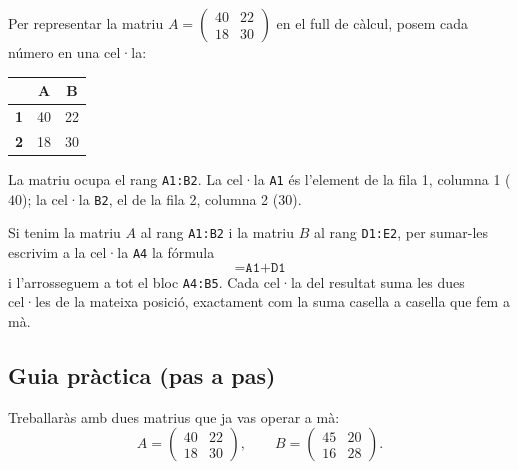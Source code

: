 \begin{exemple}
Per representar la matriu $A=\begin{pmatrix} 40 & 22 \\ 18 & 30 \end{pmatrix}$
en el full de càlcul, posem cada número en una cel·la:
\begin{center}
\begin{tabular}{c|cc}
 & \textbf{A} & \textbf{B} \\
\hline
\textbf{1} & 40 & 22 \\
\textbf{2} & 18 & 30 \\
\end{tabular}
\end{center}
La matriu ocupa el rang \texttt{A1:B2}. La cel·la \texttt{A1} és l'element de la
fila 1, columna 1 ($40$); la cel·la \texttt{B2}, el de la fila 2, columna 2 ($30$).
\end{exemple}

\begin{exemple}
Si tenim la matriu $A$ al rang \texttt{A1:B2} i la matriu $B$ al rang
\texttt{D1:E2}, per sumar-les escrivim a la cel·la \texttt{A4} la fórmula
\[
\texttt{=A1+D1}
\]
i l'arrosseguem a tot el bloc \texttt{A4:B5}. Cada cel·la del resultat suma les
dues cel·les de la mateixa posició, exactament com la suma casella a casella que
fem a mà.
\end{exemple}

\subsection{Guia pràctica (pas a pas)}

Treballaràs amb dues matrius que ja vas operar a mà:
\[
A=\begin{pmatrix} 40 & 22 \\ 18 & 30 \end{pmatrix},\qquad
B=\begin{pmatrix} 45 & 20 \\ 16 & 28 \end{pmatrix}.
\]

